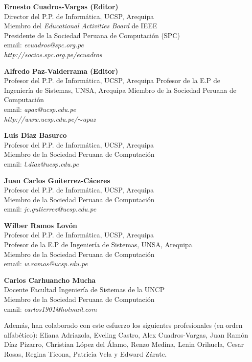 \begin{center}
\textbf{Ernesto Cuadros-Vargas (Editor)}\\
Director del P.P. de Informática, UCSP, Arequipa\\
Miembro del \textit{Educational Activities Board} de IEEE\\
Presidente de la Sociedad Peruana de Computación (SPC)\\
email: \textit{ecuadros@spc.org.pe}\\
\textit{http://socios.spc.org.pe/ecuadros}
\end{center}

\begin{center}
\textbf{Alfredo Paz-Valderrama (Editor)}\\
Profesor del P.P. de Informática, UCSP, Arequipa
Profesor de la E.P de Ingenierí­a de Sistemas, UNSA, Arequipa
Miembro de la Sociedad Peruana de Computación\\
email: \textit{apaz@ucsp.edu.pe}\\
\textit{http://www.ucsp.edu.pe/$\sim$apaz}
\end{center}

\begin{center}
\textbf{Luis Diaz Basurco}\\
Profesor del P.P. de Informática, UCSP, Arequipa\\
Miembro de la Sociedad Peruana de Computación\\
email: \textit{l.diaz@ucsp.edu.pe}
\end{center}

\begin{center}
\textbf{Juan Carlos Guiterrez-Cáceres}\\
Profesor del P.P. de Informática, UCSP, Arequipa\\
Miembro de la Sociedad Peruana de Computación\\
email: \textit{jc.gutierrez@ucsp.edu.pe}
\end{center}

\begin{center}
\textbf{Wilber Ramos Lovón}\\
Profesor del P.P. de Informática, UCSP, Arequipa\\
Profesor de la E.P de Ingenierí­a de Sistemas, UNSA, Arequipa\\
Miembro de la Sociedad Peruana de Computación\\
email: \textit{w.ramos@ucsp.edu.pe}
\end{center}

\begin{center}
\textbf{Carlos Carhuancho Mucha}\\
Docente Facultad Ingenierí­a de Sistemas de la UNCP\\
Miembro de la Sociedad Peruana de Computación\\
email: \textit{carlos1901@hotmail.com}
\end{center}

Además, han colaborado con este esfuerzo los siguientes profesionales (en orden alfabético): Eliana Adriazola, Eveling Castro, Alex Cuadros-Vargas, Juan Ramón Dí­az Pizarro, Christian López del Álamo, Renzo Medina, Lenin Orihuela, Cesar Rosas, Regina Ticona, Patricia Vela y Edward Zárate.
\newpage